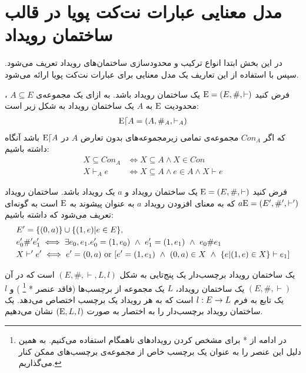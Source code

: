 \section{مدل معنایی عبارات نت‌کت پویا در قالب ساختمان رویداد}
در این بخش ابتدا انواع ترکیب و محدود‌سازی ساختمان‌‌های رویداد تعریف می‌شود.
سپس با استفاده از این تعاریف  یک مدل معنایی برای عبارات نت‌کت پویا ارائه می‌شود.

\begin{definition}
    فرض کنید
    $\mathrm{E} = (E,\#,\vdash)$
    یک ساختمان رویداد باشد.
    به ازای یک مجموعه‌ی
    $A \subseteq E$
    ،
    محدودیت
    $\mathrm{E}$
    به
    $A$
    یک ساختمان رویداد به شکل زیر است:
    \begin{align*}
        \mathrm{E} \lceil A = (A,\#_A,\vdash_A)
    \end{align*}
    که اگر 
    $Con_A$
    مجموعه‌ی تمامی زیرمجموعه‌های بدون تعارض 
    $A$ 
    در 
    $\mathrm{E}\lceil A$
    باشد آنگاه داشته باشیم:
    \begin{align*}
        X \subseteq Con_A & \iff X \subseteq A \wedge X \in Con                 \\
        X \vdash_A e      & \iff X \subseteq A \wedge e \in A \wedge X \vdash e
    \end{align*}
\end{definition}

\begin{definition}
    فرض کنید
    $\mathrm{E} = (E,\#,\vdash)$
    یک ساختمان رویداد و
    $a$
    یک رویداد باشد.
    ساختمان رویداد
    $a\mathrm{E} = (E',\#',\vdash')$
    که به معنای افزودن رویداد 
    $a$
    به عنوان پیشوند
    به 
    $\mathrm{E}$
    است
    به گونه‌ای تعریف می‌شود که داشته باشیم:
    \begin{align*}
         & E' = \s{(0,a)} \cup \s{(1,e)|e \in E},                                                                               \\
         & e_0' \#' e_1'  \iff \exists e_0,e_1.e_0' = (1,e_0)
        \ \wedge \ e_1' = (1,e_1) \ \wedge \ e_0 \# e_1                                                                         \\
         & X \vdash' e' \iff e' = (0,a) \text{ or } [e' = (1,e_1) \ \wedge \ (0,a)\in X \ \wedge \ \s{e|(1,e)\in X} \vdash e_1]
    \end{align*}
\end{definition}

\begin{definition}
    یک ساختمان رویداد برچسب‌دار
    یک پنج‌تایی به شکل
    $(E,\#,\vdash,L,l)$
    است که در آن
    $(E,\#,\vdash)$
    یک ساختمان رویداد،
    $L$
    یک مجموعه از برچسب‌ها
    (فاقد عنصر *
    \footnote{
        در ادامه از * برای مشخص کردن رویداد‌های ناهمگام استفاده می‌کنیم. به همین دلیل این عنصر را به عنوان یک برچسب خاص از مجموعه‌ی برچسب‌های ممکن کنار می‌گذاریم.
    }
    )
    و
    $l$
    یک تابع به فرم
    $l: E \rightarrow L$
    است که به هر رویداد یک برچسب اختصاص می‌دهد.
    یک ساختمان رویداد برچسب‌دار را به اختصار به صورت
    $(\mathrm{E},L,l)$
    نشان می‌دهیم.
\end{definition}


